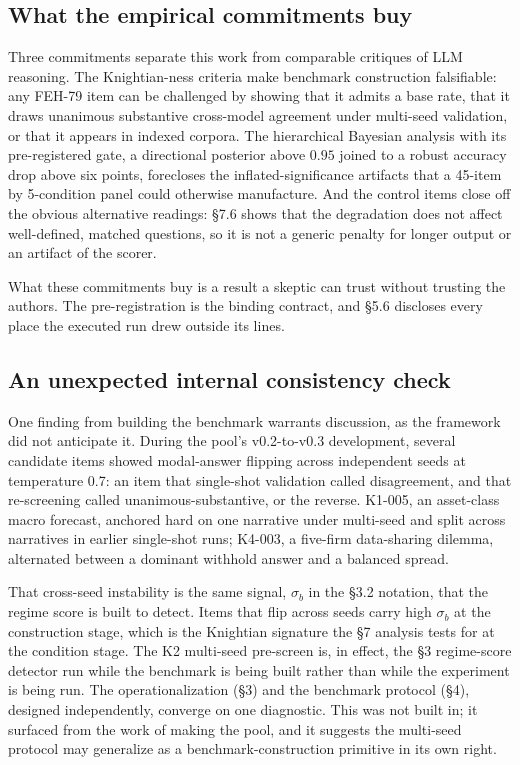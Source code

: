 \documentclass{article}
\begin{document}
\subsection{What the empirical commitments
buy}\label{what-the-empirical-commitments-buy}

Three commitments separate this work from comparable critiques of LLM
reasoning. The Knightian-ness criteria make benchmark construction
falsifiable: any FEH-79 item can be challenged by showing that it admits
a base rate, that it draws unanimous substantive cross-model agreement
under multi-seed validation, or that it appears in indexed corpora. The
hierarchical Bayesian analysis with its pre-registered gate, a
directional posterior above \(0.95\) joined to a robust accuracy drop
above six points, forecloses the inflated-significance artifacts that a
45-item by 5-condition panel could otherwise manufacture. And the
control items close off the obvious alternative readings: \S{}7.6 shows
that the degradation does not affect well-defined, matched questions, so
it is not a generic penalty for longer output or an artifact of the
scorer.

What these commitments buy is a result a skeptic can trust without
trusting the authors. The pre-registration is the binding contract, and
\S{}5.6 discloses every place the executed run drew outside its lines.

\subsection{An unexpected internal consistency
check}\label{an-unexpected-internal-consistency-check}

One finding from building the benchmark warrants discussion, as the
framework did not anticipate it. During the pool's v0.2-to-v0.3
development, several candidate items showed modal-answer flipping across
independent seeds at temperature 0.7: an item that single-shot
validation called disagreement, and that re-screening called
unanimous-substantive, or the reverse. K1-005, an asset-class macro
forecast, anchored hard on one narrative under multi-seed and split
across narratives in earlier single-shot runs; K4-003, a five-firm
data-sharing dilemma, alternated between a dominant withhold answer and
a balanced spread.

That cross-seed instability is the same signal, \(\sigma_{b}\) in the
\S{}3.2 notation, that the regime score is built to detect. Items that flip
across seeds carry high \(\sigma_{b}\) at the construction stage, which
is the Knightian signature the \S{}7 analysis tests for at the condition
stage. The K2 multi-seed pre-screen is, in effect, the \S{}3 regime-score
detector run while the benchmark is being built rather than while the
experiment is being run. The operationalization (\S{}3) and the benchmark
protocol (\S{}4), designed independently, converge on one diagnostic. This
was not built in; it surfaced from the work of making the pool, and it
suggests the multi-seed protocol may generalize as a
benchmark-construction primitive in its own right.
\end{document}
